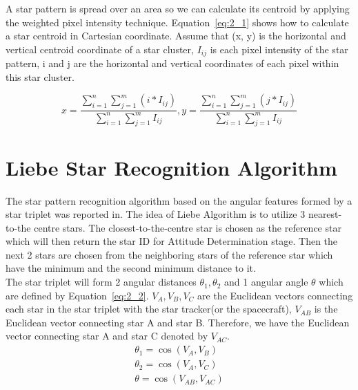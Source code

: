 \noindent A star pattern is spread over an area so we can calculate its centroid by applying the weighted pixel intensity technique. Equation~\ref{eq:2_1} shows how to calculate a star centroid in Cartesian coordinate. Assume that (x, y) is the horizontal and vertical centroid coordinate of a star cluster, $I_{ij}$ is each pixel intensity of the star pattern, i and j are the horizontal and vertical coordinates of each pixel within this star cluster.



\begin{equation} %
	x = \frac{\displaystyle\sum_{i=1}^{n} \displaystyle\sum_{j=1}^{m} (i * I_{ij})} {\displaystyle\sum_{i=1}^{n} \displaystyle\sum_{j=1}^{m} I_{ij}}, y = \frac{\displaystyle\sum_{i=1}^{n} \displaystyle\sum_{j=1}^{m} (j * I_{ij})} {\displaystyle\sum_{i=1}^{n} \displaystyle\sum_{j=1}^{m} I_{ij}}
	\label{eq:2_1}
\end{equation}

\section{Liebe Star Recognition Algorithm}

The star pattern recognition algorithm based on the angular features formed by a star triplet was reported in\cite{edseee.38797119950101,edseee.18038319930101,000176062300018n.d.,edseee.103539620020101,edseee.79314719990101}. The idea of Liebe Algorithm is to utilize 3 nearest-to-the centre stars. The closest-to-the-centre star is chosen as the reference star which will then return the star ID for Attitude Determination stage. Then the next 2 stars are chosen from the neighboring stars of the reference star which have the minimum and the second minimum distance to it. \\

\noindent The star triplet will form 2 angular distances $\theta_1, \theta_2$ and 1 angular angle $\theta$ which are defined by Equation~\ref{eq:2_2}. $V_A, V_B, V_C$ are the Euclidean vectors connecting each star in the star triplet with the star tracker(or the spacecraft), $V_{AB}$ is the Euclidean vector connecting star A and star B. Therefore, we have the Euclidean vector connecting star A and star C denoted by $V_{AC}$.
\begin{equation}
	\begin{aligned}
		\theta_1 = \cos(V_A, V_B) \\
		\theta_2 = \cos(V_A, V_C) \\
		\theta = \cos(V_{AB}, V_{AC})
	\end{aligned}
	\label{eq:2_2}
\end{equation}


